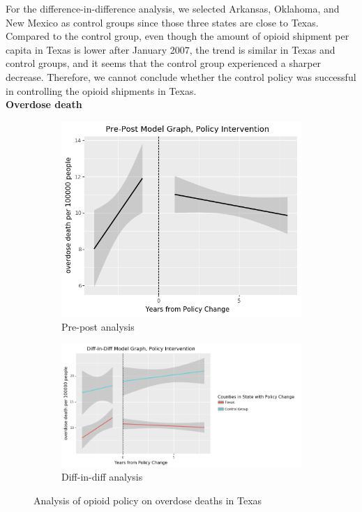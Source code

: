 \documentclass[12pt,letterpaper]{article}
\begin{document}
For the difference-in-difference analysis, we selected Arkansas, Oklahoma, and New Mexico as control groups since those three states are close to Texas. Compared to the control group, even though the amount of opioid shipment per capita in Texas is lower after January 2007, the trend is similar in Texas and control groups, and it seems that the control group experienced a sharper decrease. Therefore, we cannot conclude whether the control policy was successful in controlling the opioid shipments in Texas. \\

\noindent \textbf{Overdose death}

\begin{figure}[!h]
\centering
\begin{subfigure}{.5\textwidth}
  \centering
  \includegraphics[width=0.7\linewidth]{../30_results/General_Results/texas_overdose_death_prepost.png}
  \caption{Pre-post analysis}
  \label{fig:tx_death_prepost}
\end{subfigure}%
\begin{subfigure}{.55\textwidth}
  \centering
  \includegraphics[width=1\linewidth]{../30_results/General_Results/texas_overdose_death_diffdiff.png}
  \caption{Diff-in-diff analysis}
  \label{fig:tx_death_did}
\end{subfigure}
\caption{Analysis of opioid policy on overdose deaths in Texas}
\label{fig:tx_death}
\end{figure}
\end{document}
